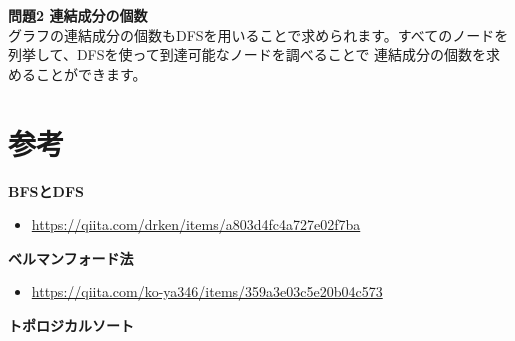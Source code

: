 \noindent \textbf{問題2 連結成分の個数} \\
グラフの連結成分の個数もDFSを用いることで求められます。すべてのノードを列挙して、DFSを使って到達可能なノードを調べることで
連結成分の個数を求めることができます。 \\

\section{参考}

\textbf{BFSとDFS}
\begin{itemize}
    \item \url{https://qiita.com/drken/items/a803d4fc4a727e02f7ba}
\end{itemize}

\noindent \textbf{ベルマンフォード法}
\begin{itemize}
    \item \url{https://qiita.com/ko-ya346/items/359a3e03c5e20b04c573}
\end{itemize}

\noindent \textbf{トポロジカルソート}